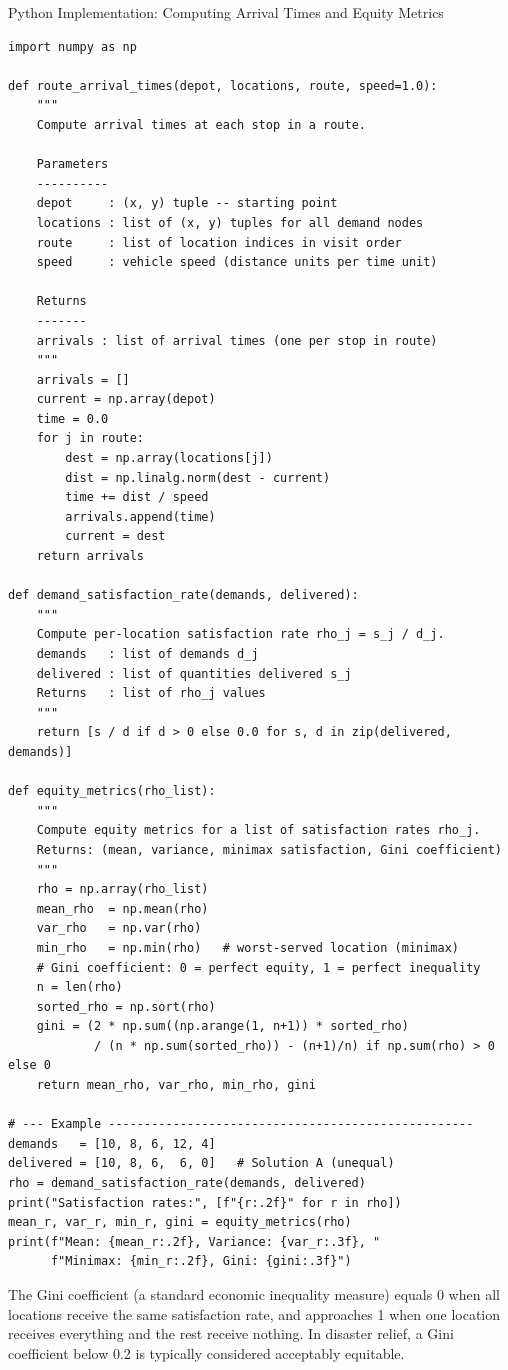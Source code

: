 \documentclass[aspectratio=169,10pt]{beamer}
\begin{document}
\begin{frame}[fragile]{Python Implementation: Computing Arrival Times and Equity Metrics}
\begin{lstlisting}
import numpy as np

def route_arrival_times(depot, locations, route, speed=1.0):
    """
    Compute arrival times at each stop in a route.

    Parameters
    ----------
    depot     : (x, y) tuple -- starting point
    locations : list of (x, y) tuples for all demand nodes
    route     : list of location indices in visit order
    speed     : vehicle speed (distance units per time unit)

    Returns
    -------
    arrivals : list of arrival times (one per stop in route)
    """
    arrivals = []
    current = np.array(depot)
    time = 0.0
    for j in route:
        dest = np.array(locations[j])
        dist = np.linalg.norm(dest - current)
        time += dist / speed
        arrivals.append(time)
        current = dest
    return arrivals

def demand_satisfaction_rate(demands, delivered):
    """
    Compute per-location satisfaction rate rho_j = s_j / d_j.
    demands   : list of demands d_j
    delivered : list of quantities delivered s_j
    Returns   : list of rho_j values
    """
    return [s / d if d > 0 else 0.0 for s, d in zip(delivered, demands)]

def equity_metrics(rho_list):
    """
    Compute equity metrics for a list of satisfaction rates rho_j.
    Returns: (mean, variance, minimax satisfaction, Gini coefficient)
    """
    rho = np.array(rho_list)
    mean_rho  = np.mean(rho)
    var_rho   = np.var(rho)
    min_rho   = np.min(rho)   # worst-served location (minimax)
    # Gini coefficient: 0 = perfect equity, 1 = perfect inequality
    n = len(rho)
    sorted_rho = np.sort(rho)
    gini = (2 * np.sum((np.arange(1, n+1)) * sorted_rho)
            / (n * np.sum(sorted_rho)) - (n+1)/n) if np.sum(rho) > 0 else 0
    return mean_rho, var_rho, min_rho, gini

# --- Example ---------------------------------------------------
demands   = [10, 8, 6, 12, 4]
delivered = [10, 8, 6,  6, 0]   # Solution A (unequal)
rho = demand_satisfaction_rate(demands, delivered)
print("Satisfaction rates:", [f"{r:.2f}" for r in rho])
mean_r, var_r, min_r, gini = equity_metrics(rho)
print(f"Mean: {mean_r:.2f}, Variance: {var_r:.3f}, "
      f"Minimax: {min_r:.2f}, Gini: {gini:.3f}")
\end{lstlisting}

  The Gini coefficient (a standard economic inequality measure) equals
  0 when all locations receive the same satisfaction rate, and approaches
  1 when one location receives everything and the rest receive nothing.
  In disaster relief, a Gini coefficient below 0.2 is typically
  considered acceptably equitable.
\end{frame}
\end{document}
